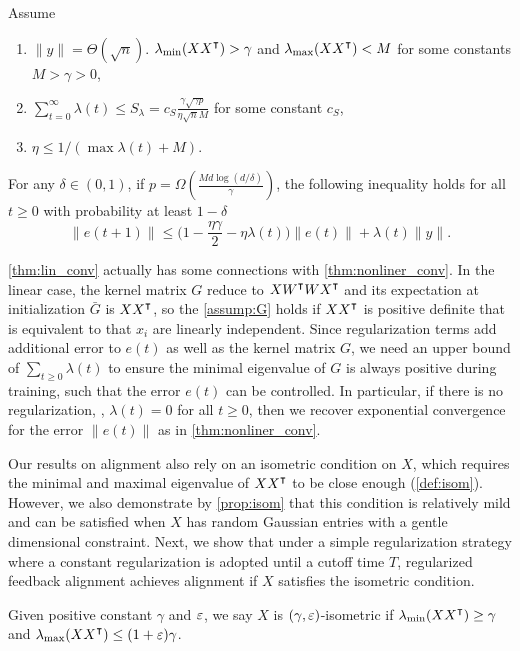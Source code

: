 \begin{theorem}
\label{thm:lin_conv}
Assume
\begin{enumerate}
\item $\|y\| = \Theta(\sqrt n)$. $\lambda_{\min}(XX\transpose)>\gamma$ and $\lambda_{\max}(XX\transpose)<M$ for some constants $M>\gamma>0$,
\item $\sum_{t=0}^\infty \lambda(t) \leq  S_\lambda = c_{S}\frac{\gamma\sqrt{\gamma p}}{\eta\sqrt{n}M}$ for some constant $c_{S}$,
\item $\eta \leq 1/(\max \lambda(t)+M)$.
\end{enumerate}
For any $\delta\in(0,1)$, if $p = \Omega(\frac{Md\log(d/\delta)}{\gamma})$, the following inequality holds for all $t\geq 0$ with probability at least $1-\delta$
\begin{equation}
\label{eq:reg_error_bd}
\|e(t+1)\|\leq \big(1-\frac{\eta\gamma}{2}-\eta\lambda(t)\big)\|e(t)\| + \lambda(t)\|y\|.
\end{equation} 
\end{theorem}

\cref{thm:lin_conv} actually has some connections with \cref{thm:nonliner_conv}. In the linear case, the kernel matrix $G$ reduce to $X W\transpose W X\transpose$ and its expectation at initialization $\bar{G}$ is $X X\transpose$, so the \cref{assump:G} holds if $XX\transpose$ is positive definite that is equivalent to that $x_i$ are linearly independent. Since regularization terms add additional error to $e(t)$ as well as the kernel matrix $G$, we need an upper bound of $\sum_{t\geq 0}\lambda(t)$ to ensure the minimal eigenvalue of $G$ is always positive during training, such that the error $e(t)$ can be controlled. In particular, if there is no regularization, \ie, $\lambda(t)=0$ for all $t\geq 0$, then we recover exponential convergence for the error $\|e(t)\|$ as in \cref{thm:nonliner_conv}.

Our results on alignment also rely on an isometric condition on $X$, which requires the minimal and maximal eigenvalue of $XX\transpose$ to be close enough (\cf \cref{def:isom}). However, we also demonstrate by \cref{prop:isom} that this condition is relatively mild and can be satisfied when $X$ has random Gaussian entries with a gentle dimensional constraint. Next, we show that under a simple regularization strategy where a constant regularization is adopted until a cutoff time $T$, regularized feedback alignment achieves alignment if $X$ satisfies the isometric condition.
{}
\begin{definition}
\label{def:isom}
Given positive constant $\gamma$ and $\varepsilon$, we say $X$ is $(\gamma, \varepsilon)$-isometric if 
$\lambda_{\min}(XX\transpose)\geq\gamma$ and $\lambda_{\max}(XX\transpose)\leq(1+\eps)\gamma$.
\end{definition}

